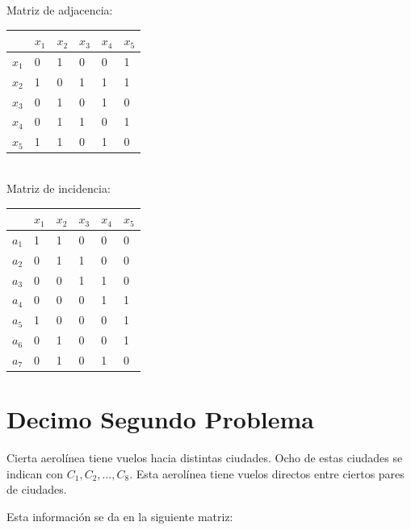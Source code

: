 \documentclass[journal,12pt,onecolumn]{IEEEtran}                %
\theoremstyle{break}                                            %
\begin{document}
        Matriz de adjacencia:

        \begin{tabular}{|l|l|l|l|l|l|}
            \hline
                  & $x_1$ & $x_2$ & $x_3$ & $x_4$ & $x_5$ \\ \hline
            $x_1$ & 0     & 1     & 0     & 0     & 1     \\ \hline
            $x_2$ & 1     & 0     & 1     & 1     & 1     \\ \hline
            $x_3$ & 0     & 1     & 0     & 1     & 0     \\ \hline
            $x_4$ & 0     & 1     & 1     & 0     & 1     \\ \hline
            $x_5$ & 1     & 1     & 0     & 1     & 0     \\ \hline
        \end{tabular}
        \\[3em]

        Matriz de incidencia:

        \begin{tabular}{|l|l|l|l|l|l|}
            \hline
                  & $x_1$ & $x_2$ & $x_3$ & $x_4$ & $x_5$ \\ \hline
            $a_1$ & 1     & 1     & 0     & 0     & 0     \\ \hline
            $a_2$ & 0     & 1     & 1     & 0     & 0     \\ \hline
            $a_3$ & 0     & 0     & 1     & 1     & 0     \\ \hline
            $a_4$ & 0     & 0     & 0     & 1     & 1     \\ \hline
            $a_5$ & 1     & 0     & 0     & 0     & 1     \\ \hline
            $a_6$ & 0     & 1     & 0     & 0     & 1     \\ \hline
            $a_7$ & 0     & 1     & 0     & 1     & 0     \\ \hline
        \end{tabular}

    \clearpage
    \section*{Decimo Segundo Problema}
        Cierta aerolínea tiene vuelos hacia distintas ciudades. 
        Ocho de estas ciudades se indican con $C_1, C_2, \dots , C_8$.
        Esta aerolínea tiene vuelos directos entre ciertos pares de ciudades. 

        Esta información se da en la siguiente matriz:
\end{document}
